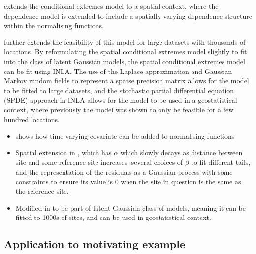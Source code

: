 \documentclass{article}
\numberwithin{equation}{section}
\begin{document}
\cite{Wadsworth2018} extends the conditional extremes model to a spatial context, where the dependence model is extended to include a spatially varying dependence structure within the normalising functions. 

\cite{Simpsons2023} further extends the feasibility of this model for large datasets with thousands of locations. 
By reformulating the spatial conditional extremes model slightly to fit into the class of latent Gaussian models, the spatial conditional extremes model can be fit using INLA.
The use of the Laplace approximation and Gaussian Markov random fields to represent a sparse precision matrix allows for the model to be fitted to large datasets, and the stochastic partial differential equation (SPDE) approach in INLA allows for the model to be used in a geostatistical context, where previously the model was shown to only be feasible for a few hundred locations. 

\begin{itemize}
  \item \cite{Winter2016} shows how time varying covariate can be added to normalising functions
  \item Spatial extension in \cite{Wadsworth2018}, which has $\alpha$ which slowly decays as distance between site and some reference site increases, several choices of $\beta$ to fit different tails, and the representation of the residuals as a Gaussian process with some constraints to ensure its value is 0 when the site in question is the same as the reference site. 
  \item Modified in \cite{Simpson2023} to be part of latent Gaussian class of models, meaning it can be fitted to 1000s of sites, and can be used in geostatistical context.
\end{itemize}



\subsection{Application to motivating example}
\end{document}
